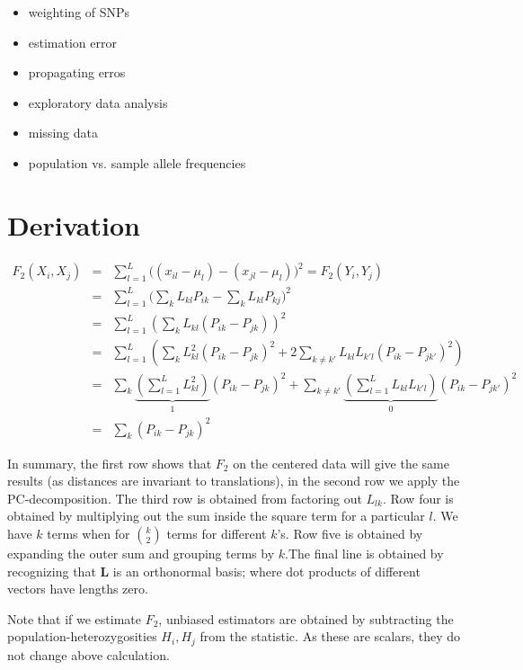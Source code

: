 \documentclass[12pt,a4pape, fullpage]{article}
\newcommand{\ML}{\mathbf{L}} %
\begin{document}
\begin{itemize}
    \item weighting of SNPs
    \item estimation error
    \item propagating erros
    \item exploratory data analysis
    \item missing data
    \item population vs. sample allele frequencies
\end{itemize}

\appendix
\section{Derivation}\label{appendix:fonpc}
\begin{eqnarray}
F_2(X_i, X_j) &=& \sum_{l=1}^L \big( (x_{il} - \mu_l) -(x_{jl} -\mu_l)\big)^2 = F_2(Y_i, Y_j)\nonumber\\
&=& \sum_{l=1}^L \big( \sum_k L_{kl}P_{ik} - \sum_kL_{kl}P_{kj}\big)^2\nonumber\\
&=& \sum_{l=1}^L \left( \sum_k L_{kl} (P_{ik} -P_{jk}) \right)^2\nonumber\\
&=& \sum_{l=1}^L \left( \sum_k L_{kl}^2 (P_{ik} -P_{jk})^2 + 2\sum_{k\neq k'} L_{kl}L_{k'l}(P_{ik} - P_{jk'})^2 \right)\nonumber\\
&=& \sum_k \underbrace{\left(\sum_{l=1}^L L_{kl}^2\right)}_1 (P_{ik} -P_{jk})^2 + \sum_{k\neq k'}\underbrace{\left(\sum_{l=1}^L L_{kl}L_{k'l}\right)}_{0} (P_{ik} - P_{jk'})^2\nonumber\\
&=& \sum_k (P_{ik} - P_{jk})^2
\end{eqnarray}

In summary, the first row shows that $F_2$ on the centered data will give the same results (as distances are invariant to translations), in the second row we apply the PC-decomposition. The third row is obtained from factoring out $L_{lk}$. Row four is obtained by multiplying out the sum inside the square term for a particular $l$. We have $k$ terms when for $\binom{k}{2}$ terms for different $k$'s.  Row five is obtained by expanding the outer sum and grouping terms by $k$.The final line is obtained by recognizing that $\ML$ is an orthonormal basis; where dot products of different vectors have lengths zero.

Note that if we estimate $F_2$, unbiased estimators are obtained by subtracting the population-heterozygosities $H_i, H_j$ from the statistic. As these are scalars, they do not change above calculation.

\end{document}
